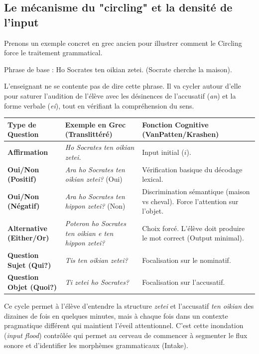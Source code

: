 \subsection{Le mécanisme du "circling" et la densité de l'input}

Prenons un exemple concret en grec ancien pour illustrer comment le Circling force le traitement
grammatical.

Phrase de base : Ho Socrates ten oikian zetei. (Socrate cherche la maison).

L'enseignant ne se contente pas de dire cette phrase. Il va \og cycler\fg{} autour d'elle pour
saturer l'audition de l'élève avec les désinences de l'accusatif (\textit{\-an}) et la forme verbale
(\textit{\-ei}), tout en vérifiant la compréhension du sens.\cite{III-2-3-ref17}

\begin{table}[h!]\small\centering\begin{tabular}{| p{2.3cm} | p{3.5cm} | p{3.5cm} |}\hline\textbf{Type de Question} & \textbf{Exemple en Grec (Translittéré)} & \textbf{Fonction Cognitive (VanPatten/Krashen)} \\ \hline\textbf{Affirmation} & \textit{Ho Socrates ten oikian zetei.} & Input initial ($i$). \\ \hline\textbf{Oui/Non (Positif)} & \textit{Ara ho Socrates ten oikian zetei?} (Oui) & Vérification basique du décodage lexical. \\ \hline\textbf{Oui/Non (Négatif)} & \textit{Ara ho Socrates ten hippon zetei?} (Non) & Discrimination sémantique (maison vs cheval). Force l'attention sur l'objet. \\ \hline\textbf{Alternative (Either/Or)} & \textit{Poteron ho Socrates ten oikian e ten hippon zetei?} & Choix forcé. L'élève doit produire le mot correct (Output minimal). \\ \hline\textbf{Question Sujet (Qui?)} & \textit{Tis ten oikian zetei?} & Focalisation sur le nominatif. \\ \hline\textbf{Question Objet (Quoi?)} & \textit{Ti zetei ho Socrates?} & Focalisation sur l'accusatif. \\ \hline\end{tabular}\end{table}Ce cycle permet à l'élève d'entendre la structure \textit{zetei} et l'accusatif \textit{ten oikian}
des dizaines de fois en quelques minutes, mais à chaque fois dans un contexte pragmatique différent
qui maintient l'éveil attentionnel. C'est cette \og inondation\fg{} (\textit{input flood}) contrôlée
qui permet au cerveau de commencer à segmenter le flux sonore et d'identifier les morphèmes
grammaticaux (Intake).\cite{III-2-3-ref4}



